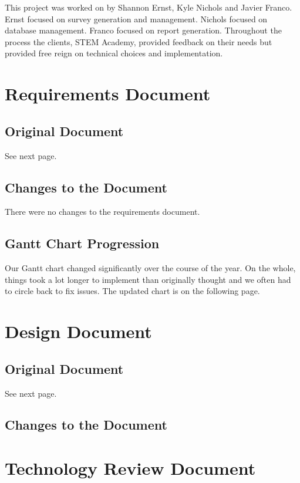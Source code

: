 \documentclass[letterpaper,10pt,serif,draftclsnofoot,onecolumn,compsoc,titlepage]{IEEEtran}
\begin{document}
This project was worked on by Shannon Ernst, Kyle Nichols and Javier Franco.
Ernst focused on survey generation and management. 
Nichols focused on database management.
Franco focused on report generation.
Throughout the process the clients, STEM Academy, provided feedback on their needs but provided free reign on technical choices and implementation. \\

\section{Requirements Document}
\subsection{Original Document}
See next page. \\

%

\subsection{Changes to the Document}
There were no changes to the requirements document. 
\subsection{Gantt Chart Progression}
Our Gantt chart changed significantly over the course of 
the year. On the whole, things took a lot longer to implement 
than originally thought and we often had to circle back to 
fix issues. The updated chart is on the following page. \\


\section{Design Document}
\subsection{Original Document}
See next page. \\

\subsection{Changes to the Document}


\section{Technology Review Document}
\end{document}
